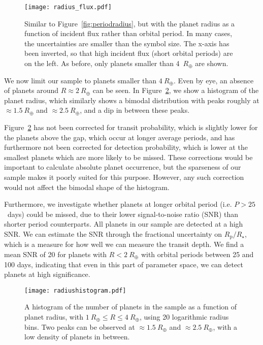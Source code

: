 \documentclass[a4paper,fleqn,usenatbib]{mnras}
\begin{document}
\begin{figure}
	\texttt{[image: radius\_flux.pdf]}
	\caption{Similar to Figure~\ref{fig:periodradius}, but with the planet radius as a function of incident flux rather than orbital period. In many cases, the uncertainties are smaller than the symbol size. The x-axis has been inverted, so that high incident flux (short orbital periods) are on the left. As before, only planets smaller than 4~$R_\oplus$ are shown.}
	\label{fig:fluxradius}
\end{figure}

We now limit our sample to planets smaller than $4~R_\oplus$. Even by eye, an absence of planets around $R \approx 2~R_\oplus$ can be seen. 
In Figure~\ref{fig:radiushistogram}, we show a histogram of the planet radius, which similarly shows a bimodal distribution with peaks roughly at $\approx 1.5~R_\oplus$ and $\approx 2.5~R_\oplus$, and a dip in between these peaks. 

Figure~\ref{fig:radiushistogram} has not been corrected for transit probability, which is slightly lower for the planets above the gap, which occur at longer average periods, and has furthermore not been corrected for detection probability, which is lower at the smallest planets which are more likely to be missed. These corrections would be important to calculate absolute planet occurrence, but the sparseness of our sample makes it poorly suited for this purpose. However, any such correction would not affect the bimodal shape of the histogram.

Furthermore, we investigate whether planets at longer orbital period (i.e. $P>25$~days) could be missed, due to their lower signal-to-noise ratio (SNR) than shorter period counterparts. All planets in our sample are detected at a high SNR. We can estimate the SNR through the fractional uncertainty on $R_\mathrm{p}/R_\star$, which is a measure for how well we can measure the transit depth. We find a mean SNR of 20 for planets with $R<2~R_\oplus$ with orbital periods between 25 and 100 days, indicating that even in this part of parameter space, we can detect planets at high significance.


\begin{figure}
	\texttt{[image: radiushistogram.pdf]}
	\caption{A histogram of the number of planets in the sample as a function of planet radius, with $1~R_\oplus \leq R \leq 4~R_\oplus$, using 20 logarithmic radius bins. Two peaks can be observed at $\approx 1.5~R_\oplus$ and $\approx 2.5~R_\oplus$, with a low density of planets in between.}
	\label{fig:radiushistogram}
\end{figure}
\end{document}
